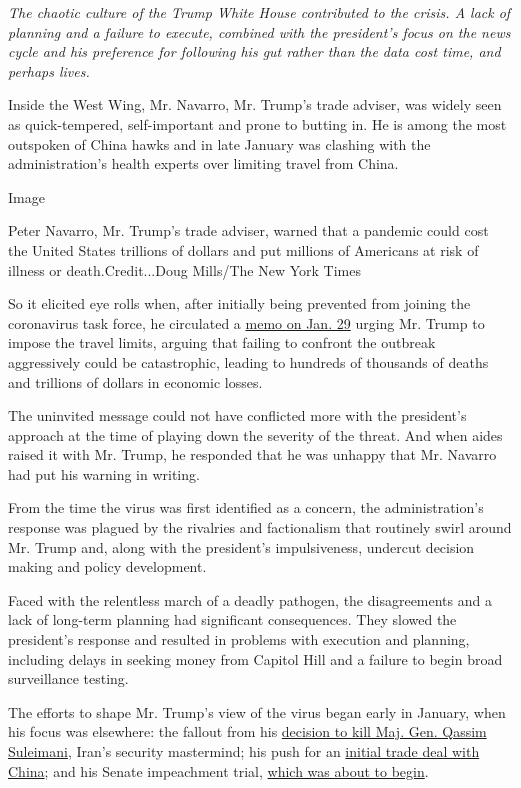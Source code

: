 \emph{The chaotic culture of the Trump White House contributed to the
crisis. A lack of planning and a failure to execute, combined with the
president's focus on the news cycle and his preference for following his
gut rather than the data cost time, and perhaps lives.}

Inside the West Wing, Mr. Navarro, Mr. Trump's trade adviser, was widely
seen as quick-tempered, self-important and prone to butting in. He is
among the most outspoken of China hawks and in late January was clashing
with the administration's health experts over limiting travel from
China.

Image

Peter Navarro, Mr. Trump's trade adviser, warned that a pandemic could
cost the United States trillions of dollars and put millions of
Americans at risk of illness or death.Credit...Doug Mills/The New York
Times

So it elicited eye rolls when, after initially being prevented from
joining the coronavirus task force, he circulated a
\href{https://www.nytimes.com/2020/04/06/us/politics/navarro-warning-trump-coronavirus.html}{memo
on Jan. 29} urging Mr. Trump to impose the travel limits, arguing that
failing to confront the outbreak aggressively could be catastrophic,
leading to hundreds of thousands of deaths and trillions of dollars in
economic losses.

The uninvited message could not have conflicted more with the
president's approach at the time of playing down the severity of the
threat. And when aides raised it with Mr. Trump, he responded that he
was unhappy that Mr. Navarro had put his warning in writing.

From the time the virus was first identified as a concern, the
administration's response was plagued by the rivalries and factionalism
that routinely swirl around Mr. Trump and, along with the president's
impulsiveness, undercut decision making and policy development.

Faced with the relentless march of a deadly pathogen, the disagreements
and a lack of long-term planning had significant consequences. They
slowed the president's response and resulted in problems with execution
and planning, including delays in seeking money from Capitol Hill and a
failure to begin broad surveillance testing.

The efforts to shape Mr. Trump's view of the virus began early in
January, when his focus was elsewhere: the fallout from his
\href{https://www.nytimes.com/2020/01/03/world/middleeast/iranian-general-qassem-soleimani-killed.html}{decision
to kill Maj. Gen. Qassim Suleimani}, Iran's security mastermind; his
push for an
\href{https://www.nytimes.com/2019/10/11/business/economy/us-china-trade-deal.html}{initial
trade deal with China}; and his Senate impeachment trial,
\href{https://www.nytimes.com/2020/01/21/us/politics/trump.html}{which
was about to begin}.

